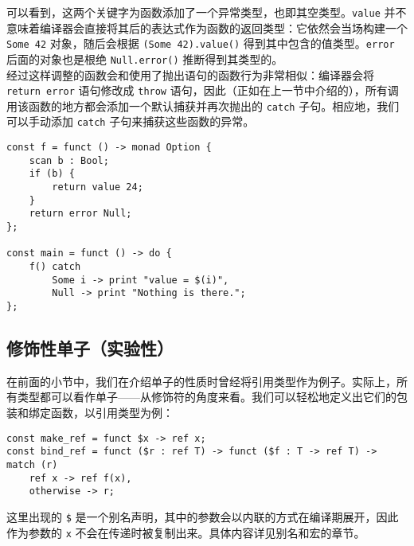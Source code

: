 可以看到，这两个关键字为函数添加了一个异常类型，也即其空类型。\lstinline!value! 并不意味着编译器会直接将其后的表达式作为函数的返回类型：它依然会当场构建一个 \lstinline!Some 42! 对象，随后会根据 \lstinline!(Some 42).value()! 得到其中包含的值类型。\lstinline!error! 后面的对象也是根绝 \lstinline!Null.error()! 推断得到其类型的。 \\

经过这样调整的函数会和使用了抛出语句的函数行为非常相似：编译器会将 \lstinline!return error! 语句修改成 \lstinline!throw! 语句，因此（正如在上一节中介绍的），所有调用该函数的地方都会添加一个默认捕获并再次抛出的 \lstinline!catch! 子句。相应地，我们可以手动添加 \lstinline!catch! 子句来捕获这些函数的异常。

\begin{minipage}[c]{0.95\textwidth}
\vspace{1.0em}
\begin{lstlisting}
const f = funct () -> monad Option {
    scan b : Bool;
    if (b) {
        return value 24;
    }
    return error Null;
};

const main = funct () -> do {
    f() catch
        Some i -> print "value = $(i)",
        Null -> print "Nothing is there.";
};
\end{lstlisting}
\end{minipage}


\subsection{修饰性单子（实验性）}

在前面的小节中，我们在介绍单子的性质时曾经将引用类型作为例子。实际上，所有类型都可以看作单子——从修饰符的角度来看。我们可以轻松地定义出它们的包装和绑定函数，以引用类型为例：

\begin{minipage}[c]{0.95\textwidth}
\vspace{1.0em}
\begin{lstlisting}
const make_ref = funct $x -> ref x;
const bind_ref = funct ($r : ref T) -> funct ($f : T -> ref T) -> match (r)
    ref x -> ref f(x),
    otherwise -> r;
\end{lstlisting}
\end{minipage}

这里出现的 \texttt{\$} 是一个别名声明，其中的参数会以内联的方式在编译期展开，因此作为参数的 \lstinline!x! 不会在传递时被复制出来。具体内容详见别名和宏的章节。

